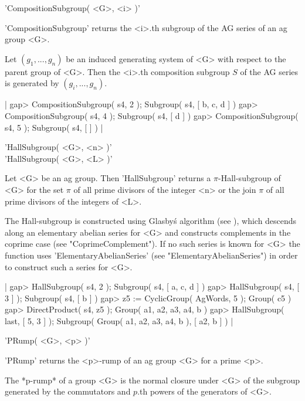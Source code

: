 
'CompositionSubgroup( <G>, <i> )'

'CompositionSubgroup' returns the <i>.th  subgroup of the AG series of an
ag group <G>.

Let $(g_1, ..., g_n)$ be an induced generating system of <G> with respect
to the parent group of <G>.  Then  the <i>.th composition subgroup $S$ of
the AG series is generated by $(g_i, ..., g_n)$.

|    gap> CompositionSubgroup( s4, 2 );
    Subgroup( s4, [ b, c, d ] )
    gap> CompositionSubgroup( s4, 4 );
    Subgroup( s4, [ d ] )
    gap> CompositionSubgroup( s4, 5 );
    Subgroup( s4, [  ] ) |


'HallSubgroup( <G>, <n> )' \\
'HallSubgroup( <G>, <L> )'

Let  <G>  be an    ag   group.    Then    'HallSubgroup'      returns   a
$\pi$-Hall-subgroup of <G> for the set $\pi$ of all prime divisors of the
integer <n> or the  join $\pi$ of  all prime divisors  of the integers of
<L>.

The  Hall-subgroup  is  constructed   using   Glasby\'s   algorithm  (see
\cite{Gla87}), which descends along an  elementary abelian series for <G>
and constructs complements in the coprime case (see "CoprimeComplement").
If   no    such   series   is   known   for   <G>   the   function   uses
'ElementaryAbelianSeries'  (see "ElementaryAbelianSeries")  in  order  to
construct such a series for <G>.

|    gap> HallSubgroup( s4, 2 );
    Subgroup( s4, [ a, c, d ] )
    gap> HallSubgroup( s4, [ 3 ] );
    Subgroup( s4, [ b ] )
    gap> z5 := CyclicGroup( AgWords, 5 );
    Group( c5 )
    gap> DirectProduct( s4, z5 );
    Group( a1, a2, a3, a4, b )
    gap> HallSubgroup( last, [ 5, 3 ] );
    Subgroup( Group( a1, a2, a3, a4, b ), [ a2, b ] ) |


'PRump( <G>, <p> )'

'PRump' returns the <p>-rump of an ag group <G> for a prime <p>.

The *p-rump*  of a  group  <G> is  the  normal closure under   <G> of the
subgroup generated by the commutators and $p$.th powers of the generators
of <G>.

